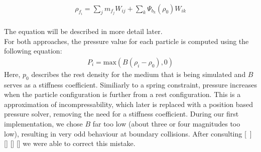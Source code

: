 \documentclass{ACGSeminar}
\begin{document}
\\
\begin{equation} 
\begin{aligned}
\rho_{f_{i}} = \sum_{j}m_{f_{j}}W_{ij} + \sum_{k}\Psi_{b_{k}}(\rho_{0})W_{ik}
\end{aligned}
\end{equation}
\\
The equation will be described in more detail later.\\
For both approaches, the pressure value for each particle is computed using the following equation:\\
\begin{equation} 
\begin{aligned}
P_i = \text{max}(B(\rho_i - \rho_0),0)
\end{aligned}
\end{equation}
Here, \(p_0\) describes the rest density for the medium that is being simulated and \(B\) serves as a stiffness coefficient. Similiarly to a spring constraint, pressure increases when the particle configuration is further from a rest configuration. This is a approximation of incompressability, which later is replaced with a position based pressure solver, removing the need for a stiffness coefficient.
During our first implementation, we chose \(B\) far too low (about three or four magnitudes too low), resulting in very odd behaviour at boundary collisions. After consulting [~\cite{Becker}] [\cite{Liu}] [\cite{Akinci}] [\cite{Bridson2016}] we were able to correct this mistake.\\
\\
\label{subsec:Pressure Force}
\end{document}
